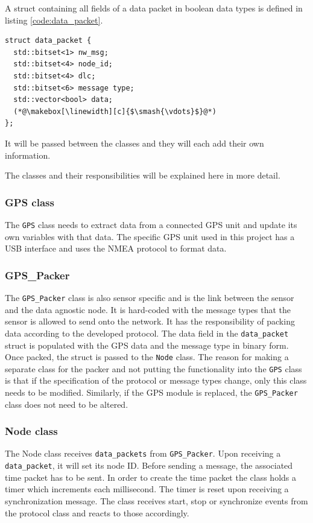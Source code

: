 A struct containing all fields of a data packet in boolean data types is defined in listing \ref{code:data_packet}.  

\begin{lstlisting}[caption=Struct for data packet.,label=code:data_packet]
struct data_packet {
  std::bitset<1> nw_msg;
  std::bitset<4> node_id;
  std::bitset<4> dlc;
  std::bitset<6> message type;
  std::vector<bool> data; 
  (*@\makebox[\linewidth][c]{$\smash{\vdots}$}@*)
};
\end{lstlisting}
It will be passed between the classes and they will each add their own information. 

The classes and their responsibilities will be explained here in more detail.

\subsubsection*{GPS class}
The \texttt{GPS} class needs to extract data from a connected GPS unit and update its own variables with that data.
The specific GPS unit used in this project has a USB interface and uses the NMEA protocol to format data.

\subsubsection*{GPS\_Packer}
The \texttt{GPS\_Packer} class is also sensor specific and is the link between the sensor and the data agnostic node.
It is hard-coded with the message types that the sensor is allowed to send onto the network.
It has the responsibility of packing data according to the developed protocol.
The data field in the \texttt{data\_packet} struct is populated with the GPS data and the message type in binary form.
Once packed, the struct is passed to the \texttt{Node} class.
The reason for making a separate class for the packer and not putting the functionality into the \texttt{GPS} class is that if the specification of the protocol or message types change, only this class needs to be modified.
Similarly, if the GPS module is replaced, the \texttt{GPS\_Packer} class does not need to be altered.

\subsubsection*{Node class}
The Node class receives \texttt{data\_packets} from \texttt{GPS\_Packer}.
Upon receiving a \texttt{data\_packet}, it will set its node ID.
Before sending a message, the associated time packet has to be sent.
In order to create the time packet the class holds a timer which increments each millisecond.
The timer is reset upon receiving a synchronization message.
The class receives start, stop or synchronize events from the protocol class and reacts to those accordingly.

